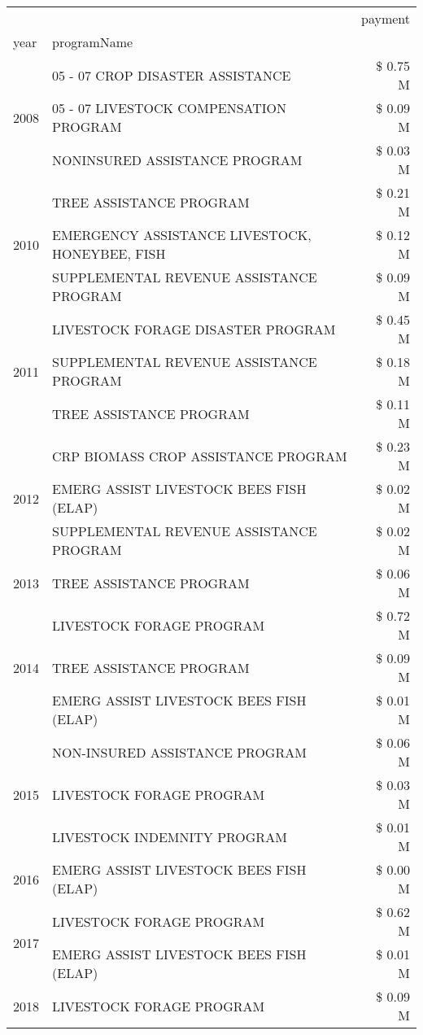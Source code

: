 \begin{tabular}{llr}
\toprule
 &  & payment \\
year & programName &  \\
\midrule
\multirow[t]{3}{*}{2008} & 05 - 07 CROP DISASTER ASSISTANCE & \$ 0.75 M \\
 & 05 - 07 LIVESTOCK COMPENSATION PROGRAM & \$ 0.09 M \\
 & NONINSURED ASSISTANCE PROGRAM & \$ 0.03 M \\
\cline{1-3}
\multirow[t]{3}{*}{2010} & TREE ASSISTANCE PROGRAM & \$ 0.21 M \\
 & EMERGENCY ASSISTANCE LIVESTOCK, HONEYBEE, FISH & \$ 0.12 M \\
 & SUPPLEMENTAL REVENUE ASSISTANCE PROGRAM & \$ 0.09 M \\
\cline{1-3}
\multirow[t]{3}{*}{2011} & LIVESTOCK FORAGE DISASTER PROGRAM & \$ 0.45 M \\
 & SUPPLEMENTAL REVENUE ASSISTANCE PROGRAM & \$ 0.18 M \\
 & TREE ASSISTANCE PROGRAM & \$ 0.11 M \\
\cline{1-3}
\multirow[t]{3}{*}{2012} & CRP BIOMASS CROP ASSISTANCE PROGRAM & \$ 0.23 M \\
 & EMERG ASSIST LIVESTOCK BEES FISH (ELAP) & \$ 0.02 M \\
 & SUPPLEMENTAL REVENUE ASSISTANCE PROGRAM & \$ 0.02 M \\
\cline{1-3}
2013 & TREE ASSISTANCE PROGRAM & \$ 0.06 M \\
\cline{1-3}
\multirow[t]{3}{*}{2014} & LIVESTOCK FORAGE PROGRAM & \$ 0.72 M \\
 & TREE ASSISTANCE PROGRAM & \$ 0.09 M \\
 & EMERG ASSIST LIVESTOCK BEES FISH (ELAP) & \$ 0.01 M \\
\cline{1-3}
\multirow[t]{3}{*}{2015} & NON-INSURED ASSISTANCE PROGRAM & \$ 0.06 M \\
 & LIVESTOCK FORAGE PROGRAM & \$ 0.03 M \\
 & LIVESTOCK INDEMNITY PROGRAM & \$ 0.01 M \\
\cline{1-3}
2016 & EMERG ASSIST LIVESTOCK BEES FISH (ELAP)       & \$ 0.00 M \\
\cline{1-3}
\multirow[t]{2}{*}{2017} & LIVESTOCK FORAGE PROGRAM & \$ 0.62 M \\
 & EMERG ASSIST LIVESTOCK BEES FISH (ELAP) & \$ 0.01 M \\
\cline{1-3}
\multirow[t]{3}{*}{2018} & LIVESTOCK FORAGE PROGRAM & \$ 0.09 M \\

\end{tabular}
